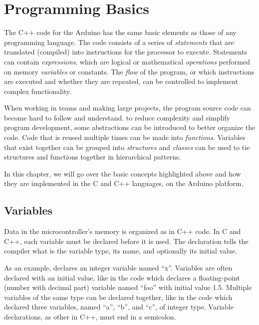 
\chapter{Programming Basics}

The C++ code for the Arduino has the same basic elements as those of any programming language. 
The code consists of a series of \emph{statements} that are translated (compiled) into instructions for the processor to execute.
Statements can contain \emph{expressions}, which are logical or mathematical \emph{operations} performed on memory \emph{variables} or constants.
The \emph{flow} of the program, or which instructions are executed and whether they are repeated, can be controlled to implement complex functionality.

When working in teams and making large projects, the program source code can become hard to follow and understand.
to reduce complexity and simplify program development, some abstractions can be introduced to better organize the code.
Code that is reused multiple times can be made into \emph{functions}.
Variables that exist together can be grouped into \emph{structures} and \emph{classes} can be used to tie structures and functions together in hierarchical patterns.

In this chapter, we will go over the basic concepts highlighted above and how they are implemented in the C and C++ languages, on the Arduino platform.

\section{Variables}
Data in the microcontroller's memory is organized as  in C++ code.
In C and C++, each variable must be declared before it is used.
The declaration tells the compiler what is the variable type, its name, and optionally its initial value.

As an example,  declares an integer variable named ``x''.
Variables are often declared with an initial value, like in the code  which declares a floating-point (number with decimal part) variable named ``foo'' with initial value \num{1.5}.
Multiple variables of the same type can be declared together, like in the code  which declared three variables, named ``a'', ``b'', and ``c'', of integer type.
Variable declarations, as other  in C++, must end in a semicolon.

